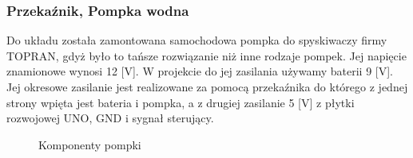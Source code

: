 \documentclass[12pt]{article}
\begin{document}
\subsubsection{Przekaźnik, Pompka wodna}
Do układu została zamontowana samochodowa pompka do spyskiwaczy firmy TOPRAN, gdyż było to tańsze rozwiązanie niż inne rodzaje pompek. Jej napięcie znamionowe wynosi 12 [V]. W projekcie do jej zasilania używamy baterii 9 [V]. Jej okresowe zasilanie jest realizowane za pomocą przekaźnika do którego z jednej strony wpięta jest bateria i pompka, a z drugiej zasilanie 5 [V] z płytki rozwojowej UNO, GND i sygnał sterujący.




\begin{figure}
\centering
{}
\quad
{}
\quad
{}
\caption{Komponenty pompki}

\end{figure}
\end{document}
